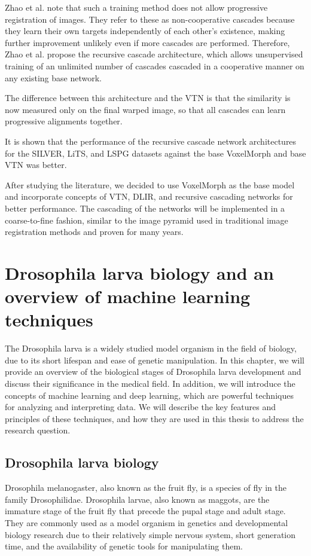 \documentclass{report}
\begin{document}
	Zhao et al. \cite{Zhao_2019} note that such a training method does not allow progressive registration of images. They refer to these as non-cooperative cascades because they learn their own targets independently of each other's existence, making further improvement unlikely even if more cascades are performed. Therefore, Zhao et al. \cite{Zhao_2019} propose the recursive cascade architecture, which allows unsupervised training of an unlimited number of cascades cascaded in a cooperative manner on any existing base network.
	
	The difference between this architecture and the VTN is that the similarity is now measured only on the final warped image, so that all cascades can learn progressive alignments together.
	
	It is shown that the performance of the recursive cascade network architectures for the SILVER, LiTS, and LSPG datasets against the base VoxelMorph and base VTN was better.
	
	
	After studying the literature, we decided to use VoxelMorph as the base model and incorporate concepts of VTN, DLIR, and recursive cascading networks for better performance. The cascading of the networks will be implemented in a coarse-to-fine fashion, similar to the image pyramid used in traditional image registration methods and proven for many years.

	\chapter{Drosophila larva biology and an overview of machine learning techniques}
	The Drosophila larva is a widely studied model organism in the field of biology, due to its short lifespan and ease of genetic manipulation. In this chapter, we will provide an overview of the biological stages of Drosophila larva development and discuss their significance in the medical field. In addition, we will introduce the concepts of machine learning and deep learning, which are powerful techniques for analyzing and interpreting data. We will describe the key features and principles of these techniques, and how they are used in this thesis to address the research question.
	
	\section{Drosophila larva biology}
	Drosophila melanogaster, also known as the fruit fly, is a species of fly in the family Drosophilidae. Drosophila larvae, also known as maggots, are the immature stage of the fruit fly that precede the pupal stage and adult stage. They are commonly used as a model organism in genetics and developmental biology research due to their relatively simple nervous system, short generation time, and the availability of genetic tools for manipulating them.
	
\end{document}
